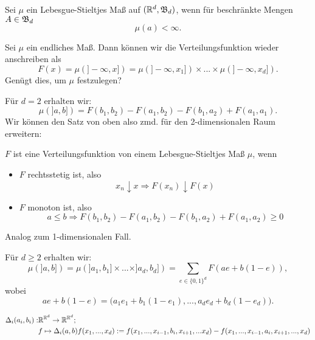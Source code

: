 			\begin{defi}
				Sei $\mu$ ein Lebesgue-Stieltjes Maß auf $(\mathbb{R}^d, \mathfrak{B}_d)$, wenn für beschränkte Mengen $A\in\mathfrak{B}_d$
				\[ \mu(a)<\infty. \]
			\end{defi}
			
			\begin{bem}
				Sei $\mu$ ein endliches Maß. Dann können wir die Verteilungsfunktion wieder anschreiben als
				\[ F(x)=\mu(]-\infty,x])=\mu(]-\infty,x_1])\times...\times\mu(]-\infty,x_d]). \]
				Genügt dies, um $\mu$ festzulegen?
			\end{bem}
			
			\begin{bsp}
				Für $d=2$ erhalten wir:
				\[ \mu(]a,b])=F(b_1,b_2)-F(a_1,b_2)-F(b_1,a_2)+F(a_1,a_1). \]
				Wir können den Satz von oben also zmd. für den 2-dimensionalen Raum erweitern:
			\end{bsp}
			
			\begin{satz}
				$F$ ist eine Verteilungsfunktion von einem Lebesgue-Stieltjes Maß $\mu$, wenn 
				\begin{itemize}
					\item $F$ rechtsstetig ist, also
					\[ x_n\downarrow x\Rightarrow F(x_n)\downarrow F(x) \]
					\item $F$ monoton ist, also
					\[ a\le b\Rightarrow F(b_1,b_2)-F(a_1,b_2)-F(b_1,a_2)+F(a_1,a_2)\ge 0 \]
				\end{itemize}
			\end{satz}
			
			\begin{bew}
				Analog zum 1-dimensionalen Fall.
			\end{bew}
			
			\begin{bsp}
				Für $d\ge 2$ erhalten wir:
				\[ \mu(]a,b])=\mu(]a_1,b_1]\times...\times]a_d,b_d])=\sum_{e\in\{0,1\}^d} F(ae+b(1-e)), \]
				wobei 
				\[ ae+b(1-e)=\big(a_1e_1+b_1(1-e_1),...,a_de_d+b_d(1-e_d)\big). \]
			\end{bsp}
			
			\begin{defi}[Differenzoperatoren]
				\begin{align*} \Delta_i(a_i,b_i): &\mathbb{R}^{\mathbb{R}^d}\to\mathbb{R}^{\mathbb{R}^d};\\&f\mapsto \Delta_i (a,b)f(x_1,...,x_d):=f(x_1,...,x_{i-1},b_i,x_{i+1},...x_d)-f(x_1,...,x_{i-1},a_i,x_{i+1},...,x_d)
				\end{align*}
			\end{defi}
			
